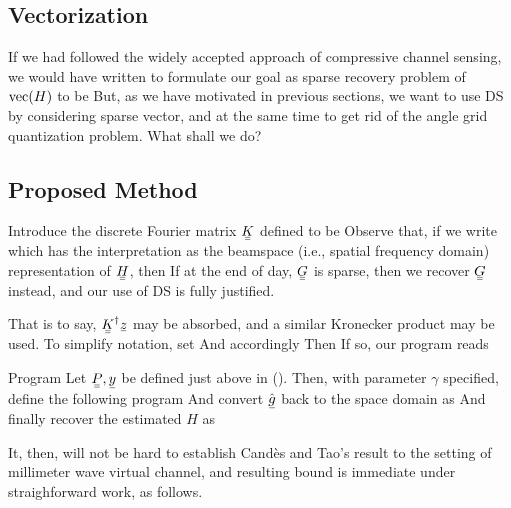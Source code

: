 \subsection{Vectorization}

If we had followed the widely accepted approach of compressive channel sensing, we would have written
%
%
to formulate our goal as sparse recovery problem of \(\mathrm{vec} (H)\) to be
%
%
But, as we have motivated in previous sections, we want to use DS by considering sparse vector, and at the same time to get rid of the angle grid quantization problem.
What shall we do?

\subsection{Proposed Method}

Introduce the discrete Fourier matrix \(\M{K}\) defined to be
%
%
Observe that, if we write
%
%
which has the interpretation as the beamspace (i.e., spatial frequency domain) representation of \(\M{H}\), then
%
%
If at the end of day, \(\M{G}\) is sparse, then we recover \(\M{G}\) instead, and our use of DS is fully justified.

That is to say, \(\M{K}^\H \V{z}\) may be absorbed, and a similar Kronecker product may be used.
To simplify notation, set 
%
%
And accordingly
%
Then
%
%
If so, our program reads

\Result
{Program}
{
Let \(\M{P}, \V{y}\) be defined just above in ().
Then, with parameter \(\gamma\) specified, define the following program
%
%
And convert \(\hat{\V{g}}\) back to the space domain as
%
%
And finally recover the estimated \(H\) as
%
%
}

It, then, will not be hard to establish Cand\`es and Tao's result to the setting of millimeter wave virtual channel, and resulting bound is immediate under straighforward work, as follows.
